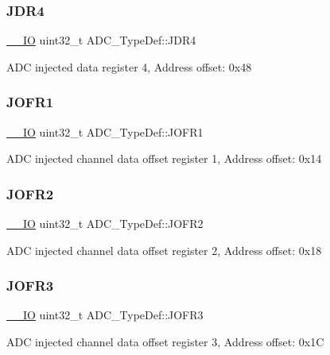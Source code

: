 \subsubsection{\texorpdfstring{JDR4}{JDR4}}
{\footnotesize\ttfamily \mbox{\hyperlink{core__sc300_8h_aec43007d9998a0a0e01faede4133d6be}{\+\_\+\+\_\+\+IO}} uint32\+\_\+t A\+D\+C\+\_\+\+Type\+Def\+::\+J\+D\+R4}

A\+DC injected data register 4, Address offset\+: 0x48 \mbox{\label{struct_a_d_c___type_def_aa005e656f528aaad28d70d61c9db9b81}} 
\subsubsection{\texorpdfstring{JOFR1}{JOFR1}}
{\footnotesize\ttfamily \mbox{\hyperlink{core__sc300_8h_aec43007d9998a0a0e01faede4133d6be}{\+\_\+\+\_\+\+IO}} uint32\+\_\+t A\+D\+C\+\_\+\+Type\+Def\+::\+J\+O\+F\+R1}

A\+DC injected channel data offset register 1, Address offset\+: 0x14 \mbox{\label{struct_a_d_c___type_def_aa20f76044c11042dde41c1060853fb82}} 
\subsubsection{\texorpdfstring{JOFR2}{JOFR2}}
{\footnotesize\ttfamily \mbox{\hyperlink{core__sc300_8h_aec43007d9998a0a0e01faede4133d6be}{\+\_\+\+\_\+\+IO}} uint32\+\_\+t A\+D\+C\+\_\+\+Type\+Def\+::\+J\+O\+F\+R2}

A\+DC injected channel data offset register 2, Address offset\+: 0x18 \mbox{\label{struct_a_d_c___type_def_ae9c78142f6edf8122384263878d09015}} 
\subsubsection{\texorpdfstring{JOFR3}{JOFR3}}
{\footnotesize\ttfamily \mbox{\hyperlink{core__sc300_8h_aec43007d9998a0a0e01faede4133d6be}{\+\_\+\+\_\+\+IO}} uint32\+\_\+t A\+D\+C\+\_\+\+Type\+Def\+::\+J\+O\+F\+R3}

A\+DC injected channel data offset register 3, Address offset\+: 0x1C \mbox{\label{struct_a_d_c___type_def_a92f5c1a5aaa8b286317f923482e09d35}} 
